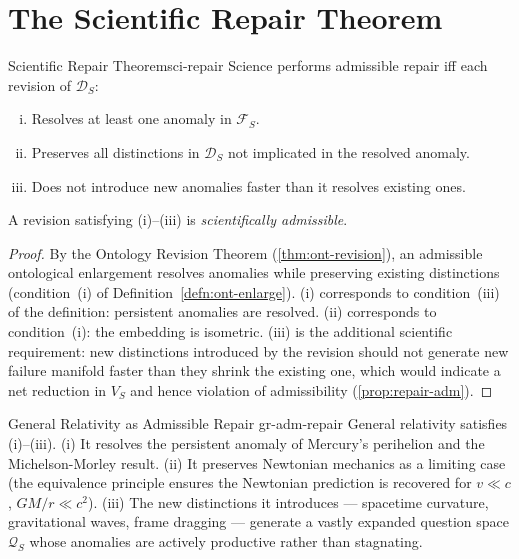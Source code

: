 \documentclass[12pt,twoside,openright]{book}
\begin{document}
\section{The Scientific Repair Theorem}

\begin{theorem}{Scientific Repair Theorem}{sci-repair}
  Science performs admissible repair iff each revision
  of $\mathcal{D}_S$:
  \begin{enumerate}[(i)]
    \item Resolves at least one anomaly in $\mathcal{F}_S$.
    \item Preserves all distinctions in $\mathcal{D}_S$
          not implicated in the resolved anomaly.
    \item Does not introduce new anomalies faster than
          it resolves existing ones.
  \end{enumerate}
  A revision satisfying (i)--(iii) is
  \emph{scientifically admissible}.
\end{theorem}

\begin{proof}
  By the Ontology Revision Theorem
  (\cref{thm:ont-revision}), an admissible ontological
  enlargement resolves anomalies while preserving
  existing distinctions (condition~(i) of
  Definition~\ref{defn:ont-enlarge}).
  (i) corresponds to condition~(iii) of the definition:
  persistent anomalies are resolved.
  (ii) corresponds to condition~(i): the embedding is
  isometric.
  (iii) is the additional scientific requirement:
  new distinctions introduced by the revision should
  not generate new failure manifold faster than they
  shrink the existing one, which would indicate a
  net reduction in $V_S$ and hence violation of
  admissibility (\cref{prop:repair-adm}).
\end{proof}

\begin{example}{General Relativity as Admissible Repair}%
  {gr-adm-repair}
  General relativity satisfies (i)--(iii).
  (i) It resolves the persistent anomaly of Mercury's
  perihelion and the Michelson-Morley result.
  (ii) It preserves Newtonian mechanics as a limiting
  case (the equivalence principle ensures the
  Newtonian prediction is recovered for
  $v \ll c$, $GM/r \ll c^2$).
  (iii) The new distinctions it introduces — spacetime
  curvature, gravitational waves, frame dragging —
  generate a vastly expanded question space $\mathcal{Q}_S$
  whose anomalies are actively productive rather than
  stagnating.
\end{example}
\end{document}

